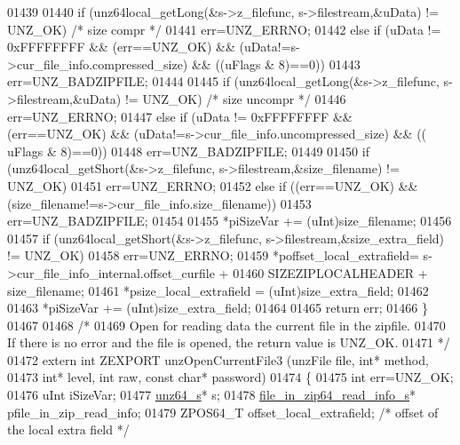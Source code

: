 \begin{DoxyCode}
01439 
01440     \textcolor{keywordflow}{if} (unz64local\_getLong(&s->z\_filefunc, s->filestream,&uData) != UNZ\_OK) \textcolor{comment}{/* size compr */}
01441         err=UNZ\_ERRNO;
01442     \textcolor{keywordflow}{else} \textcolor{keywordflow}{if} (uData != 0xFFFFFFFF && (err==UNZ\_OK) && (uData!=s->cur\_file\_info.compressed\_size) && ((uFlags 
      & 8)==0))
01443         err=UNZ\_BADZIPFILE;
01444 
01445     \textcolor{keywordflow}{if} (unz64local\_getLong(&s->z\_filefunc, s->filestream,&uData) != UNZ\_OK) \textcolor{comment}{/* size uncompr */}
01446         err=UNZ\_ERRNO;
01447     \textcolor{keywordflow}{else} \textcolor{keywordflow}{if} (uData != 0xFFFFFFFF && (err==UNZ\_OK) && (uData!=s->cur\_file\_info.uncompressed\_size) && ((
      uFlags & 8)==0))
01448         err=UNZ\_BADZIPFILE;
01449 
01450     \textcolor{keywordflow}{if} (unz64local\_getShort(&s->z\_filefunc, s->filestream,&size\_filename) != UNZ\_OK)
01451         err=UNZ\_ERRNO;
01452     \textcolor{keywordflow}{else} \textcolor{keywordflow}{if} ((err==UNZ\_OK) && (size\_filename!=s->cur\_file\_info.size\_filename))
01453         err=UNZ\_BADZIPFILE;
01454 
01455     *piSizeVar += (uInt)size\_filename;
01456 
01457     \textcolor{keywordflow}{if} (unz64local\_getShort(&s->z\_filefunc, s->filestream,&size\_extra\_field) != UNZ\_OK)
01458         err=UNZ\_ERRNO;
01459     *poffset\_local\_extrafield= s->cur\_file\_info\_internal.offset\_curfile +
01460                                     SIZEZIPLOCALHEADER + size\_filename;
01461     *psize\_local\_extrafield = (uInt)size\_extra\_field;
01462 
01463     *piSizeVar += (uInt)size\_extra\_field;
01464 
01465     \textcolor{keywordflow}{return} err;
01466 \}
01467 
01468 \textcolor{comment}{/*}
01469 \textcolor{comment}{  Open for reading data the current file in the zipfile.}
01470 \textcolor{comment}{  If there is no error and the file is opened, the return value is UNZ\_OK.}
01471 \textcolor{comment}{*/}
01472 \textcolor{keyword}{extern} \textcolor{keywordtype}{int} ZEXPORT unzOpenCurrentFile3 (unzFile file, \textcolor{keywordtype}{int}* method,
01473                                             \textcolor{keywordtype}{int}* level, \textcolor{keywordtype}{int} raw, \textcolor{keyword}{const} \textcolor{keywordtype}{char}* password)
01474 \{
01475     \textcolor{keywordtype}{int} err=UNZ\_OK;
01476     uInt iSizeVar;
01477     \hyperlink{structunz64__s}{unz64\_s}* s;
01478     \hyperlink{structfile__in__zip64__read__info__s}{file\_in\_zip64\_read\_info\_s}* pfile\_in\_zip\_read\_info;
01479     ZPOS64\_T offset\_local\_extrafield;  \textcolor{comment}{/* offset of the local extra field */}

\end{DoxyCode}
